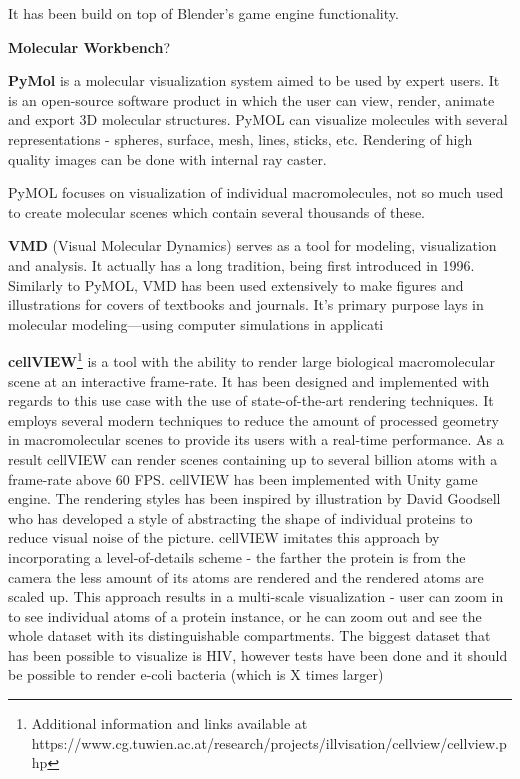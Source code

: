 \documentclass[
  digital, %
  table,   %
  nolof,     %
  nolot,     %
]{fithesis3}
\begin{document}
It has been build on top of Blender's game engine functionality.

\textbf{Molecular Workbench}?

\textbf{PyMol}\cite{PyMOL} is a molecular visualization system aimed to be used by expert users. It is an open-source software product in which the user can view, render, animate and export 3D molecular structures. PyMOL can visualize molecules with several representations - spheres, surface, mesh, lines, sticks, etc. Rendering of high quality images can be done with internal ray caster.

PyMOL focuses on visualization of individual macromolecules, not so much used to create molecular scenes which contain several thousands of these.

\textbf{VMD} (Visual Molecular Dynamics)\cite{HUMP96} serves as a tool for modeling, visualization and analysis. It actually has a long tradition, being first introduced in 1996. Similarly to PyMOL, VMD has been used extensively to make figures and illustrations for covers of textbooks and journals. It's primary purpose lays in molecular modeling—using computer simulations in applicati

\textbf{cellVIEW}\footnote{Additional information and links available at https://www.cg.tuwien.ac.at/research/projects/illvisation/cellview/cellview.php}\cite{cellVIEW_2015} is a tool with the ability to render large biological macromolecular scene at an interactive frame-rate. It has been designed and implemented with regards to this use case with the use of state-of-the-art rendering techniques. It employs several modern techniques to reduce the amount of processed geometry in macromolecular scenes to provide its users with a real-time performance. As a result cellVIEW can render scenes containing up to several billion atoms with a frame-rate above 60 FPS. cellVIEW has been implemented with Unity game engine. The rendering styles has been inspired by illustration by David Goodsell who has developed a style of abstracting the shape of individual proteins to reduce visual noise of the picture. cellVIEW imitates this approach by incorporating a level-of-details scheme - the farther the protein is from the camera the less amount of its atoms are rendered and the rendered atoms are scaled up. This approach results in a multi-scale visualization - user can zoom in to see individual atoms of a protein instance, or he can zoom out and see the whole dataset with its distinguishable compartments. The biggest dataset that has been possible to visualize is HIV, however tests have been done and it should be possible to render e-coli bacteria (which is X times larger)
\end{document}
